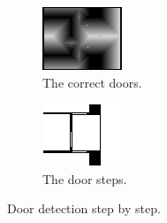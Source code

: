 \begin{figure}[ht]
\begin{subfigure}[t]{0.3\textwidth}
    \includegraphics[width = \textwidth]{graphics/correct_doors}
    \caption{The correct doors.}
    \label{correct_doors}
  \end{subfigure}
  \begin{subfigure}[t]{0.3\textwidth}
    \includegraphics[width = \textwidth]{graphics/door_steps}
    \caption{The door steps.}
    \label{door_steps}
  \end{subfigure}
\caption{Door detection step by step.}
\label{door_detections_steps}
\end{figure}